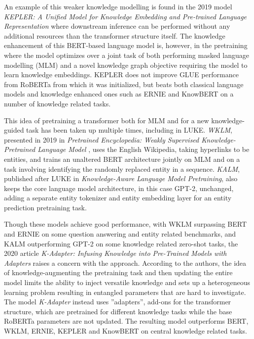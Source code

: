 \documentclass[main.tex]{subfiles}
\begin{document}
An example of this weaker knowledge modelling is found in the 2019 model \emph{KEPLER: A Unified Model for Knowledge Embedding and Pre-trained Language Representation} \cite{wang2021kepler} where downstream inference can be performed without any additional resources than the transformer structure itself.
The knowledge enhancement of this BERT-based language model is, however, in the pretraining where the model optimizes over a joint task of both performing masked language modelling (MLM) and a novel knowledge graph objective requiring the model to learn knowledge embeddings.
KEPLER does not improve GLUE performance from RoBERTa \cite{liu2019roberta} from which it was initialized, but beats both classical language models and knowledge enhanced ones such as ERNIE and KnowBERT on a number of knowledge related tasks.

This idea of pretraining a transformer both for MLM and for a new knowledge-guided task has been taken up multiple times, including in LUKE.
\emph{WKLM}, presented in 2019 in \emph{Pretrained Encyclopedia: Weakly Supervised Knowledge-Pretrained Language Model} \cite{xiong2019wklm}, uses the English Wikipedia, taking hyperlinks to be entities, and trains an unaltered BERT architecture jointly on MLM and on a task involving identifying the randomly replaced entity in a sequence.
\emph{KALM}, published after LUKE in \emph{Knowledge-Aware Language Model Pretraining}, also keeps the core language model architecture, in this case GPT-2, unchanged, adding a separate entity tokenizer and entity embedding layer for an entity prediction pretraining task.

Though these models achieve good performance, with WKLM surpassing BERT and ERNIE on some question answering and entity related benchmarks, and KALM outperforming GPT-2 on some knowledge related zero-shot tasks, the 2020 article \emph{K-Adapter: Infusing Knowledge into Pre-Trained Models with Adapters} \cite{wang2020kadapter} raises a concern with the approach.
According to the authors, the idea of knowledge-augmenting the pretraining task and then updating the entire model limits the ability to inject versatile knowledge and sets up a heterogeneous learning problem resulting in entangled parameters that are hard to investigate.
The model \emph{K-Adapter} instead uses ''adapters'', add-ons for the transformer structure, which are pretrained for different knowledge tasks while the base RoBERTa parameters are not updated.
The resulting model outperforms BERT, WKLM, ERNIE, KEPLER and KnowBERT on central knowledge related tasks.
\end{document}
